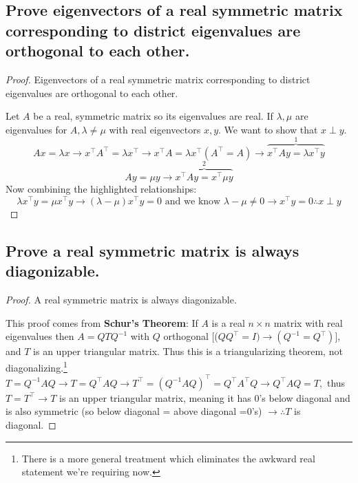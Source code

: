 \subsection{Prove eigenvectors of a real symmetric matrix corresponding to district eigenvalues are orthogonal to each other.}

\begin{proof}
    Eigenvectors of a real symmetric matrix corresponding to district eigenvalues are orthogonal to each other.

    Let $A$ be a real, symmetric matrix so its eigenvalues are real. If $\lambda,  \mu$ are eigenvalues for $A, \lambda \neq \mu$ with real eigenvectors $x,y$. We want to show that $x \perp y$.
    \[Ax=\lambda x \rightarrow x^\intercal A^\intercal = \lambda x^\intercal \rightarrow x^\intercal A = \lambda x^\intercal (A^\intercal=A) \rightarrow \overbrace{x^\intercal Ay=\lambda x^\intercal y}^{1}\]
    \[Ay = \mu y \rightarrow \overbrace{x^\intercal Ay= x^\intercal \mu y}^{2} \]
Now combining the highlighted relationships:
    \[ \lambda x^\intercal y = \mu x^\intercal  y \rightarrow (\lambda - \mu)x^\intercal y =0 \text{ and we know } \lambda - \mu \neq 0 \rightarrow x^\intercal y = 0 \therefore x \perp y\]
\end{proof}

\subsection{Prove a real symmetric matrix is always diagonizable.}

\begin{proof}
    A real symmetric matrix is always diagonizable.

    This proof comes from \textbf{Schur's Theorem}: If $A$ is a real $n \times n$ matrix with real eigenvalues then $A=QTQ^{-1}$ with $Q$ orthogonal [($QQ^\intercal = I) \rightarrow (Q^{-1}=Q^{\intercal})]$, and $T$ is an upper triangular matrix. Thus this is a triangularizing theorem, not diagonalizing.\footnote{There is a more general treatment which eliminates the awkward real statement we're requiring now.} $T=Q^{-1}AQ \rightarrow T=Q^\intercal AQ \rightarrow T^\intercal = (Q^{-1}AQ)^\intercal = Q^\intercal A^\intercal Q \rightarrow Q^\intercal A Q = T,$ thus $T =T^\intercal \rightarrow T$ is an upper triangular matrix, meaning it has 0's below diagonal and is also symmetric (so below diagonal = above diagonal =0's) $\rightarrow \therefore T$ is diagonal.
\end{proof}

